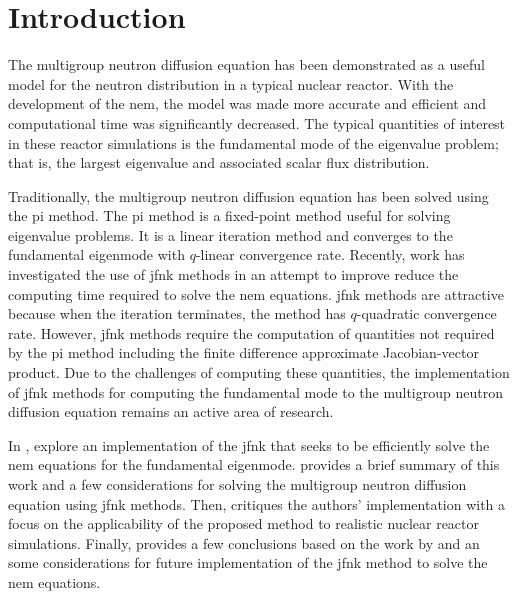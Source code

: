 \section{Introduction}
\label{sec:introduction}

  The multigroup neutron diffusion equation has been demonstrated as a useful
  model for the neutron distribution in a typical nuclear reactor. With the
  development of the \gls{nem}, the model was made more accurate and efficient
  and computational time was significantly decreased. The typical quantities of
  interest in these reactor simulations is the fundamental mode of the
  eigenvalue problem; that is, the largest eigenvalue and associated scalar flux
  distribution.

  Traditionally, the multigroup neutron diffusion equation has been solved using
  the \gls{pi} method. The \gls{pi} method is a fixed-point method useful for
  solving eigenvalue problems. It is a linear iteration method and converges to
  the fundamental eigenmode with $q$-linear convergence rate.  Recently, work
  has investigated the use of \gls{jfnk} methods in an attempt to improve reduce
  the computing time required to solve the \gls{nem} equations.
  \gls{jfnk} methods are attractive because when the iteration
  terminates, the method has $q$-quadratic convergence rate. However, \gls{jfnk}
  methods require the computation of quantities not required by the \gls{pi}
  method including the finite difference approximate Jacobian-vector product. 
  Due to the challenges of computing these quantities, the implementation of
  \gls{jfnk} methods for computing the fundamental mode to the multigroup
  neutron diffusion equation remains an active area of research.

  In , \citeauthor{qe2paper} explore an implementation of
  the \gls{jfnk} that seeks to be efficiently solve the \gls{nem} equations for
  the fundamental eigenmode.  provides a brief summary of this
  work and a few considerations for solving the multigroup neutron diffusion
  equation using \gls{jfnk} methods. Then,  critiques the
  authors' implementation with a focus on the applicability of the proposed
  method to realistic nuclear reactor simulations. Finally,
   provides a few conclusions based on the work by
  \citeauthor{qe2paper} and an some considerations for future implementation of
  the \gls{jfnk} method to solve the \gls{nem} equations.
